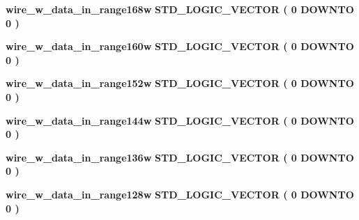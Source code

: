 \begin{DoxyCompactItemize}
{\bf wire\+\_\+w\+\_\+data\+\_\+in\+\_\+range168w} {\bfseries \textcolor{comment}{S\+T\+D\+\_\+\+L\+O\+G\+I\+C\+\_\+\+V\+E\+C\+T\+OR}\textcolor{vhdlchar}{ }\textcolor{vhdlchar}{(}\textcolor{vhdlchar}{ }\textcolor{vhdlchar}{ } \textcolor{vhdldigit}{0} \textcolor{vhdlchar}{ }\textcolor{keywordflow}{D\+O\+W\+N\+TO}\textcolor{vhdlchar}{ }\textcolor{vhdlchar}{ } \textcolor{vhdldigit}{0} \textcolor{vhdlchar}{ }\textcolor{vhdlchar}{)}\textcolor{vhdlchar}{ }} 
\item 
{\bf wire\+\_\+w\+\_\+data\+\_\+in\+\_\+range160w} {\bfseries \textcolor{comment}{S\+T\+D\+\_\+\+L\+O\+G\+I\+C\+\_\+\+V\+E\+C\+T\+OR}\textcolor{vhdlchar}{ }\textcolor{vhdlchar}{(}\textcolor{vhdlchar}{ }\textcolor{vhdlchar}{ } \textcolor{vhdldigit}{0} \textcolor{vhdlchar}{ }\textcolor{keywordflow}{D\+O\+W\+N\+TO}\textcolor{vhdlchar}{ }\textcolor{vhdlchar}{ } \textcolor{vhdldigit}{0} \textcolor{vhdlchar}{ }\textcolor{vhdlchar}{)}\textcolor{vhdlchar}{ }} 
\item 
{\bf wire\+\_\+w\+\_\+data\+\_\+in\+\_\+range152w} {\bfseries \textcolor{comment}{S\+T\+D\+\_\+\+L\+O\+G\+I\+C\+\_\+\+V\+E\+C\+T\+OR}\textcolor{vhdlchar}{ }\textcolor{vhdlchar}{(}\textcolor{vhdlchar}{ }\textcolor{vhdlchar}{ } \textcolor{vhdldigit}{0} \textcolor{vhdlchar}{ }\textcolor{keywordflow}{D\+O\+W\+N\+TO}\textcolor{vhdlchar}{ }\textcolor{vhdlchar}{ } \textcolor{vhdldigit}{0} \textcolor{vhdlchar}{ }\textcolor{vhdlchar}{)}\textcolor{vhdlchar}{ }} 
\item 
{\bf wire\+\_\+w\+\_\+data\+\_\+in\+\_\+range144w} {\bfseries \textcolor{comment}{S\+T\+D\+\_\+\+L\+O\+G\+I\+C\+\_\+\+V\+E\+C\+T\+OR}\textcolor{vhdlchar}{ }\textcolor{vhdlchar}{(}\textcolor{vhdlchar}{ }\textcolor{vhdlchar}{ } \textcolor{vhdldigit}{0} \textcolor{vhdlchar}{ }\textcolor{keywordflow}{D\+O\+W\+N\+TO}\textcolor{vhdlchar}{ }\textcolor{vhdlchar}{ } \textcolor{vhdldigit}{0} \textcolor{vhdlchar}{ }\textcolor{vhdlchar}{)}\textcolor{vhdlchar}{ }} 
\item 
{\bf wire\+\_\+w\+\_\+data\+\_\+in\+\_\+range136w} {\bfseries \textcolor{comment}{S\+T\+D\+\_\+\+L\+O\+G\+I\+C\+\_\+\+V\+E\+C\+T\+OR}\textcolor{vhdlchar}{ }\textcolor{vhdlchar}{(}\textcolor{vhdlchar}{ }\textcolor{vhdlchar}{ } \textcolor{vhdldigit}{0} \textcolor{vhdlchar}{ }\textcolor{keywordflow}{D\+O\+W\+N\+TO}\textcolor{vhdlchar}{ }\textcolor{vhdlchar}{ } \textcolor{vhdldigit}{0} \textcolor{vhdlchar}{ }\textcolor{vhdlchar}{)}\textcolor{vhdlchar}{ }} 
\item 
{\bf wire\+\_\+w\+\_\+data\+\_\+in\+\_\+range128w} {\bfseries \textcolor{comment}{S\+T\+D\+\_\+\+L\+O\+G\+I\+C\+\_\+\+V\+E\+C\+T\+OR}\textcolor{vhdlchar}{ }\textcolor{vhdlchar}{(}\textcolor{vhdlchar}{ }\textcolor{vhdlchar}{ } \textcolor{vhdldigit}{0} \textcolor{vhdlchar}{ }\textcolor{keywordflow}{D\+O\+W\+N\+TO}\textcolor{vhdlchar}{ }\textcolor{vhdlchar}{ } \textcolor{vhdldigit}{0} \textcolor{vhdlchar}{ }\textcolor{vhdlchar}{)}\textcolor{vhdlchar}{ }} 

\end{DoxyCompactItemize}
